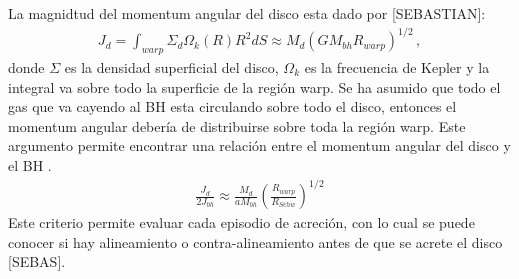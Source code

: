La magnidtud del momentum angular del disco esta dado por [SEBASTIAN]:
%
\begin{align}
    J_{d}=\int_{warp} \Sigma_{d}\Omega_{k}(R)R^{2}dS \approx M_{d}(GM_{bh}R_{warp})^{1/2}\,,
    \label{eq: magnitid J_disco}
\end{align}
%
donde $\Sigma$ es la densidad superficial del disco, $\Omega_{k}$ es la frecuencia de Kepler y la integral va sobre todo la superficie de la región warp. Se ha asumido que todo el gas que va cayendo al BH esta circulando sobre todo el disco, entonces el momentum angular debería de distribuirse sobre toda la región warp. Este argumento permite encontrar una relación entre el momentum angular del disco y el BH \cite{king2005}.
%
\begin{align}
    \frac{J_{d}}{2J_{bh}}\approx \frac{M_{d}}{aM_{bh}}\left(\frac{R_{warp}}{R_{Schw}} \right)^{1/2}
\end{align}
%
Este criterio permite evaluar cada episodio de acreción, con lo cual se puede conocer si hay alineamiento o contra-alineamiento antes de que se acrete el disco [SEBAS]. 

